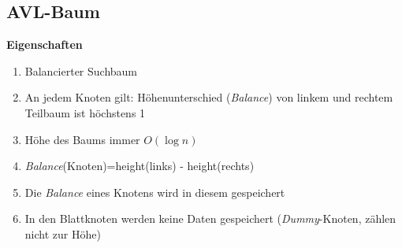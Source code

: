 \subsection{AVL-Baum}
\textbf{Eigenschaften}
\begin{enumerate}
    \item Balancierter Suchbaum
    \item An jedem Knoten gilt: Höhenunterschied (\textit{Balance}) von linkem und rechtem Teilbaum ist höchstens 1
    \item Höhe des Baums immer $O(\log n)$
    \item \textit{Balance}(Knoten)=height(links) - height(rechts)
    \item Die \textit{Balance} eines Knotens wird in diesem gespeichert
    \item In den Blattknoten werden keine Daten gespeichert (\textit{Dummy}-Knoten, zählen nicht zur Höhe)
\end{enumerate}





